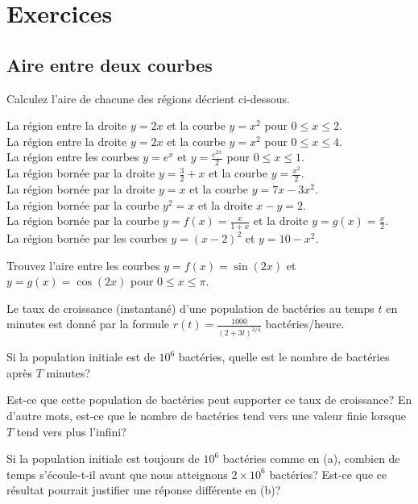 \section{Exercices}

\subsection{Aire entre deux courbes}

\begin{question}
Calculez l'aire de chacune des régions décrient ci-dessous.

 La région entre la droite $y=2x$ et la courbe
$y=x^2$ pour $0\leq x \leq 2$.\\
 La région entre la droite $y=2x$ et la courbe
$y=x^2$ pour $0\leq x \leq 4$.\\
 La région entre les courbes $y=e^x$ et
$\displaystyle y=\frac{e^{2x}}{2}$ pour $0\leq x \leq 1$.\\
 La région bornée par la droite $\displaystyle y = \frac{3}{2} + x$
et la courbe $\displaystyle y = \frac{x^2}{2}$.\\
 La région bornée par la droite $y=x$ et la courbe
$y=7x-3x^2$.\\
 La région bornée par la courbe $y^2 = x$ et la droite
$x -y = 2$.\\
 La région bornée par la courbe
$\displaystyle y = f(x)=\frac{x}{1+x}$ et la droite 
$\displaystyle y=g(x)=\frac{x}{2}$.\\
 La région bornée par les courbes
$\displaystyle y = (x-2)^2$ et $\displaystyle y= 10 - x^2$.
\label{8Q1}
\end{question}

\begin{question}[\eng \life]
Trouvez l'aire entre les courbes $y=f(x) = \sin(2x)$ et
$y=g(x)=\cos(2x)$ pour $0 \leq x \leq \pi$.
\label{8Q2}
\end{question}

\begin{question}[\life]
Le taux de croissance (instantané) d'une population de bactéries au temps
$t$ en minutes est donné par la formule
$\displaystyle r(t) = \frac{1000}{(2+3t)^{3/4}}$ bactéries/heure.

 Si la population initiale est de $10^6$ bactéries, quelle est le
nombre de bactéries après $T$ minutes?

 Est-ce que cette population de bactéries peut supporter ce taux de
croissance?  En d'autre mots, est-ce que le nombre de bactéries tend
vers une valeur finie lorsque $T$ tend vers plus l'infini?

 Si la population initiale est toujours de $10^6$ bactéries
comme en (a), combien de temps s'écoule-t-il avant que nous
atteignons $2\times 10^6$ bactéries?  Est-ce que ce résultat pourrait
justifier une réponse différente en (b)?
\label{8Q3}
\end{question}

